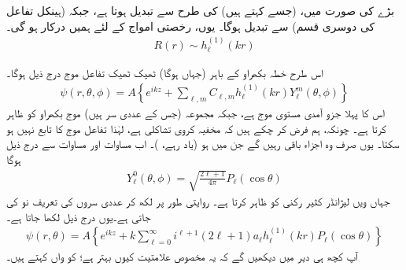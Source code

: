 بڑے   کی صورت میں،    (جسے     کہتے ہیں)   کی طرح  سے تبدیل ہوتا ہے،  جبکہ   (ہینکل تفاعل کی دوسری قسم)    سے تبدیل ہوگا۔ یوں،  رخصتی امواج کے لئے ہمیں   درکار ہو گی۔
\begin{align}
	R(r)\sim h^{(1)}_{\ell}(kr)
\end{align}

 اس طرح خطہ بکھراو کے باہر  (جہاں  ہوگا)    ٹھیک ٹھیک  تفاعل موج درج ذیل ہوگا۔ 
\begin{align}
	\psi(r, \theta, \phi) = A\left\{e^{ikz}+\sum_{\ell, m}C_{\ell, m}h^{(1)}_{\ell}(kr)Y^m_{\ell}(\theta, \phi)\right\}
\end{align}
اس کا پہلا جزو آمدی مستوی موج ہے،  جبکہ مجموعہ (جس کے عددی سر  ہیں)  موج بکھراو کو ظاہر کرتا ہے۔ چونکہ،  ہم فرض کر چکے ہیں کہ مخفیہ کروی تشاکلی ہے،  لہٰذا تفاعل موج  کا تابع نہیں ہو سکتا۔   یوں صرف وہ اجزاء باقی رہیں گے جن میں  ہو   (یاد رہے،  )۔  اب مساوات   اور  مساوات  سے درج ذیل ہوگا
\begin{align}
	Y^0_{\ell}(\theta, \phi) = \sqrt{\frac{2\ell+1}{4\pi}}P_{\ell}(\cos\theta)
\end{align}
جہاں  ویں لیژانڈر کثیر رکنی کو   ظاہر کرتا ہے۔ روایتی طور پر  لکھ کر عددی سروں کی تعریف نو   کی جاتی ہے۔یوں درج ذیل لکھا جاتا ہے۔
\begin{align}
	\psi(r, \theta) = A\left\{e^{ikz}+k\sum_{\ell=0}^{\infty}i^{\ell+1}(2\ell+1)a_{\ell}h_{\ell}^{(1)}(kr)P_{\ell}(\cos\theta)\right\}
\end{align}
آپ کچھ ہی دیر میں دیکھیں گے کہ یہ مخصوص علامتیت کیوں بہتر ہے؛   کو  واں      کہتے ہیں۔


